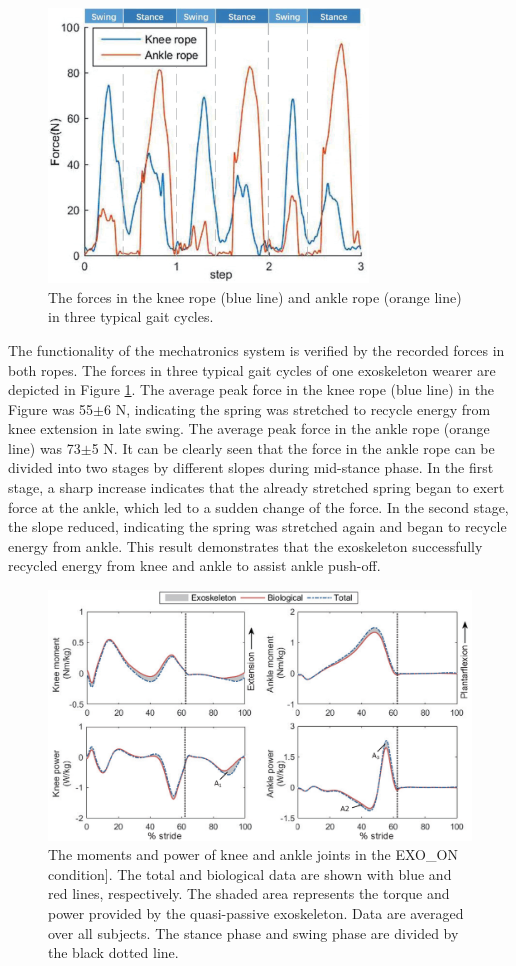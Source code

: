 \documentclass[twocolumn,cleanfoot,10pt]{asme2ej}
\begin{document}
\begin{figure}[b]
	\centering
	\includegraphics[width=8.5cm]{forces.eps}
	\caption{The forces in the knee rope (blue line) and ankle rope (orange line) in three typical gait cycles.}
	\label{fig:force}
\end{figure}


The functionality of the mechatronics system is verified by the recorded forces in both ropes. The forces in three typical gait cycles of one exoskeleton wearer are depicted in Figure \ref{fig:force}. The average peak force in the knee rope (blue line) in the Figure was 55$\pm$6 N, indicating the spring was stretched to recycle energy from knee extension in late swing. The average peak force in the ankle rope (orange line) was 73$\pm$5 N. It can be clearly seen that the force in the ankle rope can be divided into two stages by different slopes during mid-stance phase. In the first stage, a sharp increase indicates that the already stretched spring began to exert force at the ankle, which led to a sudden change of the force. In the second stage, the slope reduced, indicating the spring was stretched again and began to recycle energy from ankle. This result demonstrates that the exoskeleton successfully recycled energy from knee and ankle to assist ankle push-off. 

\begin{figure}[t]
	\centering
	\includegraphics[width=17cm]{exo.eps}
	\caption{The moments and power of knee and ankle joints in the EXO\_ON condition]. The total and biological data are shown with blue and red lines, respectively. The shaded area represents the torque and power provided by the quasi-passive exoskeleton. Data are averaged over all subjects. The stance phase and swing phase are divided by the black dotted line.}
	\label{fig:exo}
\end{figure}
\end{document}
